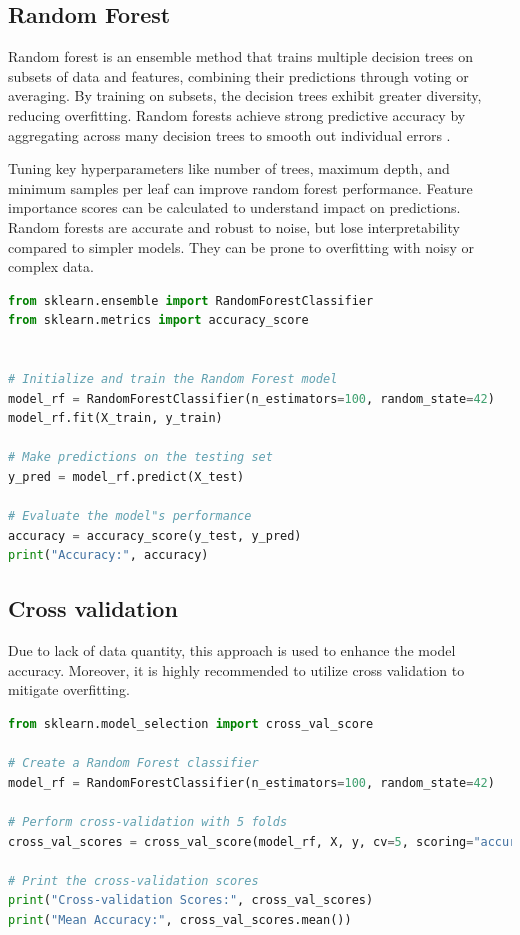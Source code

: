 \subsection{Random Forest}

Random forest is an ensemble method that trains multiple decision trees on subsets of data and features, combining their predictions through voting or averaging. By training on subsets, the decision trees exhibit greater diversity, reducing overfitting. Random forests achieve strong predictive accuracy by aggregating across many decision trees to smooth out individual errors \cite{breiman2001random}.

Tuning key hyperparameters like number of trees, maximum depth, and minimum samples per leaf can improve random forest performance. Feature importance scores can be calculated to understand impact on predictions. Random forests are accurate and robust to noise, but lose interpretability compared to simpler models. They can be prone to overfitting with noisy or complex data.



\begin{lstlisting}[language=Python]
from sklearn.ensemble import RandomForestClassifier
from sklearn.metrics import accuracy_score


# Initialize and train the Random Forest model
model_rf = RandomForestClassifier(n_estimators=100, random_state=42)
model_rf.fit(X_train, y_train)

# Make predictions on the testing set
y_pred = model_rf.predict(X_test)

# Evaluate the model"s performance
accuracy = accuracy_score(y_test, y_pred)
print("Accuracy:", accuracy)
\end{lstlisting}



\subsection{Cross validation}
Due to lack of data quantity, this approach is used to enhance the model 
accuracy. Moreover, it is highly recommended to utilize cross validation to
mitigate overfitting.





\begin{lstlisting}[language=Python]
from sklearn.model_selection import cross_val_score

# Create a Random Forest classifier
model_rf = RandomForestClassifier(n_estimators=100, random_state=42)

# Perform cross-validation with 5 folds
cross_val_scores = cross_val_score(model_rf, X, y, cv=5, scoring="accuracy")

# Print the cross-validation scores
print("Cross-validation Scores:", cross_val_scores)
print("Mean Accuracy:", cross_val_scores.mean())

\end{lstlisting}


